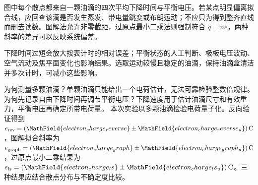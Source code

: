 图中每个散点都来自一颗油滴的四次平均下降时间与平衡电压。若某点明显偏离拟合线，应回查该滴是否发生蒸发、带电量跳变或布朗运动；不应只为得到整齐直线而删去读数。图解法允许非零截距，过原点最小二乘法则强制符合 $q=ne$，两种斜率的差异可以反映系统偏差。\par
{}
下降时间过短会放大按表计时的相对误差；平衡状态的人工判断、极板电压波动、空气流动及焦平面变化也影响结果。选取运动较慢且稳定的油滴，保持油滴盒清洁并多次计时，可减小这些影响。\par
{}
为何测量多颗油滴？单颗油滴只能给出一个电荷估计，无法可靠检验整数倍规律。为何先记录自由下降时间再调节平衡电压？下降速度用于估计油滴尺寸和有效重力，平衡电压再确定所带电荷量。
本次实验以多颗油滴检验电荷量子化。反向验证得到 $e_{\rm rev}=(\MathField{electron_charge_reverse}\pm\MathField{electron_charge_reverse_u})\,\mathrm C$，图解拟合斜率为 $e_{\rm graph}=(\MathField{electron_charge_graph}\pm\MathField{electron_charge_graph_u})\,\mathrm C$，过原点最小二乘结果为 $e_{\rm ls}=(\MathField{electron_charge_ls}\pm\MathField{electron_charge_ls_u})\,\mathrm C$。三种结果应结合散点分布与不确定度比较。

\ReportRecord

